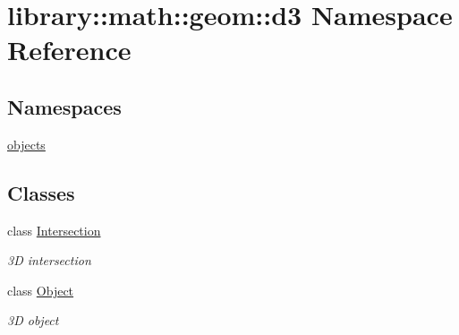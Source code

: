 \hypertarget{namespacelibrary_1_1math_1_1geom_1_1d3}{}\section{library\+:\+:math\+:\+:geom\+:\+:d3 Namespace Reference}
\label{namespacelibrary_1_1math_1_1geom_1_1d3}
\subsection*{Namespaces}
\begin{DoxyCompactItemize}
\item 
 \hyperlink{namespacelibrary_1_1math_1_1geom_1_1d3_1_1objects}{objects}
\end{DoxyCompactItemize}
\subsection*{Classes}
\begin{DoxyCompactItemize}
\item 
class \hyperlink{classlibrary_1_1math_1_1geom_1_1d3_1_1_intersection}{Intersection}
\begin{DoxyCompactList}\small\item\em 3D intersection \end{DoxyCompactList}\item 
class \hyperlink{classlibrary_1_1math_1_1geom_1_1d3_1_1_object}{Object}
\begin{DoxyCompactList}\small\item\em 3D object \end{DoxyCompactList}\end{DoxyCompactItemize}
